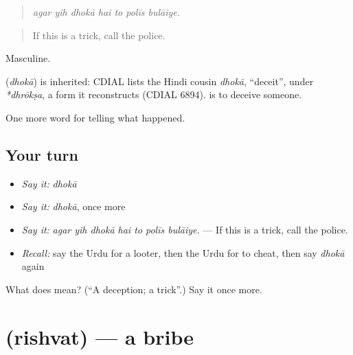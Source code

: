 \begin{quote}
      
\end{quote}

\begin{quote}
\emph{agar yih dhokā hai to polīs bulāiye.}
\end{quote}

\begin{quote}
If this is a trick, call the police.
\end{quote}

Masculine.

\begin{cousinweb}
\textbf{} (\emph{dhokā}) is inherited: CDIAL lists the Hindi cousin \emph{dhokā}, \textquotedblleft{}deceit\textquotedblright{}, under \emph{*dhrōkṣa}, a form it reconstructs (CDIAL 6894). \textbf{ } is to deceive someone.
\end{cousinweb}

\begin{grammarlens}[title={What you've built}]
One more word for telling what happened.
\end{grammarlens}

\subsection*{Your turn}
\begin{itemize}
\raggedright
  \item \emph{Say it:} \emph{dhokā}
  \item \emph{Say it:} \emph{dhokā}, once more
  \item \emph{Say it:} \emph{agar yih dhokā hai to polīs bulāiye.} — If this is a trick, call the police.
  \item \emph{Recall:} say the Urdu for a looter, then the Urdu for to cheat, then say \emph{dhokā} again
\end{itemize}

\begin{tcolorbox}[breakable,colback=teal!4,colframe=teal!35!black,title={Before you move on}]
What does  mean? (\textquotedblleft{}A deception; a trick\textquotedblright{}.) Say it once more.
\end{tcolorbox}
\section[\texorpdfstring{\ur{رشوت} (rishvat)}{رشوت (rishvat)}]{ (rishvat) — a bribe}

